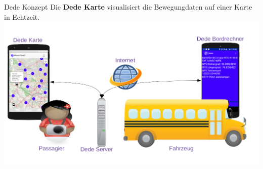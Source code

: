 \begin{frame}{Dede Konzept}
  Die \textbf{Dede Karte} visualisiert die Bewegungdaten auf einer Karte in Echtzeit.
  \includegraphics[width=\paperwidth]{dede/dede-concept}
\end{frame}
